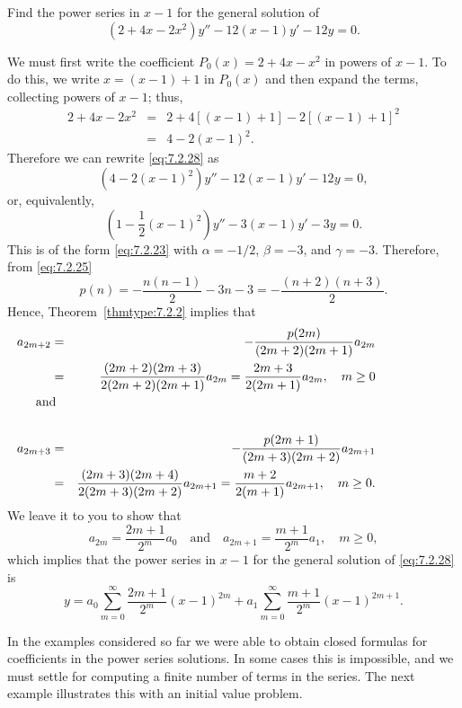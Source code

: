 \documentclass{ximera}
\begin{document}
\begin{example}\label{example:7.2.3}
Find the power series in $x-1$  for the general
solution of
\begin{equation}\label{eq:7.2.28}
(2+4x-2x^2)y''-12(x-1)y'-12y=0.
\end{equation}
\begin{explanation}
We must first write the coefficient $P_0(x)=2+4x-x^2$ in powers of
$x-1$. To do this,
 we write $x=(x-1)+1$ in $P_0(x)$ and then expand
the terms, collecting powers of $x-1$;   thus,
\begin{eqnarray*}
2+4x-2x^2&=&2+4[(x-1)+1]-2[(x-1)+1]^2\\
&=&4-2(x-1)^2.
\end{eqnarray*}
  Therefore we can rewrite \eqref{eq:7.2.28} as
$$
\left(4-2(x-1)^2\right)y''-12(x-1)y'-12y=0,
$$
or, equivalently,
$$
\left(1-\frac{1}{2}(x-1)^2\right)y''-3(x-1)y'-3y=0.
$$
This is of the form \eqref{eq:7.2.23} with  $\alpha=-1/2$, $\beta=-3$, and
$\gamma=-3$. Therefore, from \eqref{eq:7.2.25}
$$
p(n)=-\frac{n(n-1)}{2}-3n-3=-\frac{(n+2)(n+3)}{2}.
$$
Hence, Theorem~\ref{thmtype:7.2.2} implies that
\begin{eqnarray*}
a_{2m+2}&=&-\frac{p(2m)}{(2m+2)(2m+1)}a_{2m}\\&=&
\frac{(2m+2)(2m+3)}{2(2m+2)(2m+1)}
a_{2m}=\frac{2m+3}{2(2m+1)}a_{2m},\quad m\geq0\\
\noalign{\mbox{and}}\\
a_{2m+3}&=&-\frac{p(2m+1)}{(2m+3)(2m+2)}a_{2m+1}\\&=&
\frac{(2m+3)(2m+4)}{2
(2m+3)(2m+2)}a_{2m+1}=\frac{m+2}{2(m+1)}a_{2m+1},\quad m\geq0.
\end{eqnarray*}
We leave it to you to show that
$$
a_{2m}=\frac{2m+1}{2^m}a_0\quad\mbox{and}\quad
a_{2m+1}=\frac{m+1}{2^m}a_1,\quad m\geq0,
$$
which implies that the power series in $x-1$ for the general solution
of
\eqref{eq:7.2.28} is
$$
y=a_0\sum_{m=0}^\infty\frac{2m+1}{2^m}(x-1)^{2m}+a_1\sum_{m=0}^\infty
\frac{m+1}{2^m}(x-1)^{2m+1}.
$$
\end{explanation}
\end{example}

In the examples considered so far we were able to obtain closed
formulas for coefficients in the power series solutions. In some cases
this is impossible, and we must settle for computing a finite number
of terms in the series. The next example illustrates this with an
initial value problem.
\end{document}
